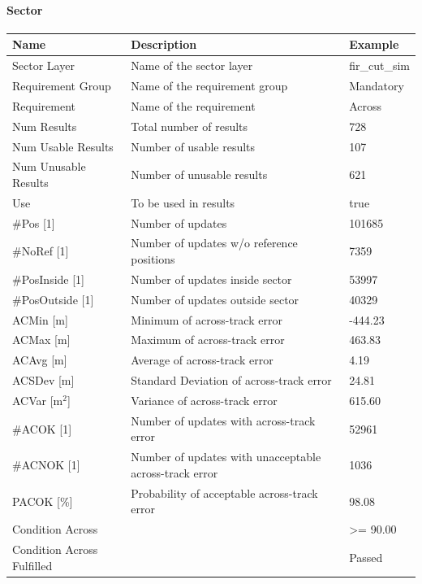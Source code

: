 \paragraph{Sector}

\begin{center}
 \begin{table}[H]
  \begin{tabularx}{\textwidth}{ | l | X |  l | }
    \hline
    \textbf{Name} & \textbf{Description} & \textbf{Example} \\ \hline
    Sector Layer & Name of the sector layer & fir\_cut\_sim \\ \hline
    Requirement Group & Name of the requirement group & Mandatory \\ \hline
    Requirement & Name of the requirement & Across \\ \hline
    Num Results & Total number of results & 728 \\ \hline
    Num Usable Results & Number of usable results & 107 \\ \hline
    Num Unusable Results & Number of unusable results & 621 \\ \hline
    Use & To be used in results & true \\ \hline
    \#Pos [1] & Number of updates & 101685 \\ \hline
    \#NoRef [1] & Number of updates w/o reference positions & 7359 \\ \hline
    \#PosInside [1] & Number of updates inside sector & 53997 \\ \hline
    \#PosOutside [1] & Number of updates outside sector & 40329 \\ \hline
    ACMin [m] & Minimum of across-track error & -444.23 \\ \hline
    ACMax [m] & Maximum of across-track error & 463.83 \\ \hline
    ACAvg [m] & Average of across-track error & 4.19 \\ \hline
    ACSDev [m] & Standard Deviation of across-track error & 24.81 \\ \hline
    ACVar [m$^2$] & Variance of across-track error & 615.60 \\ \hline
    \#ACOK [1] & Number of updates with across-track error & 52961 \\ \hline
    \#ACNOK [1] & Number of updates with unacceptable across-track error  & 1036 \\ \hline
    PACOK [\%] & Probability of acceptable across-track error & 98.08 \\ \hline
    Condition Across &  & >= 90.00 \\ \hline
    Condition Across Fulfilled &  & Passed \\ \hline
\end{tabularx}
\end{table}
\end{center}

